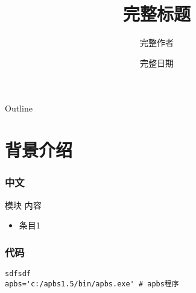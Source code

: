 \documentclass{beamer}
\title[标题]{完整标题}
\author[作者]{完整作者}
\institute[单位]{完整单位列表}
\date[日期]{完整日期}
\begin{document}

\begin{frame}
    \titlepage
\end{frame}


\begin{frame}{Outline}
    \tableofcontents
\end{frame}


\section{背景介绍}

\begin{frame}
\frametitle{中文}

\begin{block}{模块}
内容
	\begin{itemize}
	    \item 条目1
	\end{itemize}
\end{block}

\end{frame}

\begin{frame}[fragile]
\frametitle{代码}
\begin{lstlisting}
sdfsdf
apbs='c:/apbs1.5/bin/apbs.exe' # apbs程序
\end{lstlisting}
\end{frame}
\end{document}
